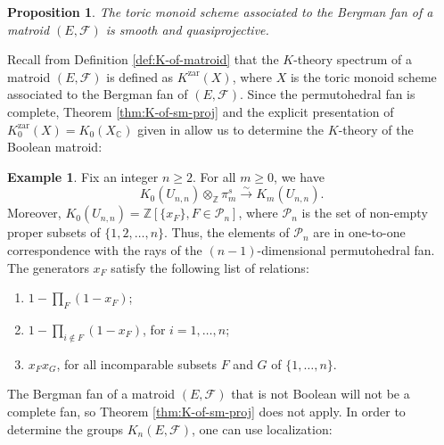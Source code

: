 \documentclass[12pt]{amsart}
\def\cF{\mathcal F}
\def\Kzar{K^{\mathrm{zar}}}
\newcommand{\Z}{\mathbb{Z}}
\numberwithin{equation}{section}
\theoremstyle{plain}
\newtheorem{prop}[equation]{Proposition}
\theoremstyle{definition}
\newtheorem{ex}[equation]{Example}
\theoremstyle{remark}
\begin{document}
\begin{prop}\label{bergman-fans-smooth}
The toric monoid scheme 
associated to the Bergman fan of a matroid $(E,\cF)$ is smooth and
quasiprojective.
\end{prop}


Recall from Definition \ref{def:K-of-matroid} that the $K$-theory
spectrum of a matroid $(E,\cF)$ is defined as $\Kzar(X)$, where $X$ is
the toric monoid scheme associated to the Bergman fan of
$(E,\cF)$. Since the permutohedral fan is complete, Theorem
\ref{thm:K-of-sm-proj} and the explicit presentation of $\Kzar_0(X) =
K_0(X_\mathbb{C})$ given in \cite[Thm.\,5.2 and page 11]{LLPP} allow
us to determine the $K$-theory of the Boolean matroid:
\begin{ex}\label{ex:K-of-boolean}
	Fix an integer $n\geq 2$. For all $m\geq 0$, we have
	\[K_0(U_{n,n})\otimes_\Z\pi_m^s\xrightarrow{\sim} K_m(U_{n,n}).\]
	 Moreover, $K_0(U_{n,n}) = \Z[\{x_F\}, F\in \mathcal{P}_n]$, where $\mathcal{P}_n$ is the set of non-empty proper subsets of $\{1,2,\dotsc, n\}.$ Thus, the elements of $\mathcal{P}_n$ are in one-to-one correspondence with the rays of the
		 $(n-1)$-dimensional permutohedral fan. The generators $x_F$ satisfy the following list of relations:
	\begin{enumerate}
		\item $1 - \displaystyle\prod_{F} (1 - x_F)$;
		\item $1 - \displaystyle\prod_{i\notin F} (1 - x_F)$, for $i = 1,\dotsc, n$;
		\item $x_F x_G$, for all incomparable subsets $F$ and $G$ of $\{1,\dotsc, n\}.$ 
	\end{enumerate}
\end{ex}

The Bergman fan of a matroid $(E,\cF)$ that is not Boolean will not be
a complete fan, so Theorem \ref{thm:K-of-sm-proj} does not apply. In
order to determine the groups $K_n(E,\cF)$, one can use localization:
\end{document}
